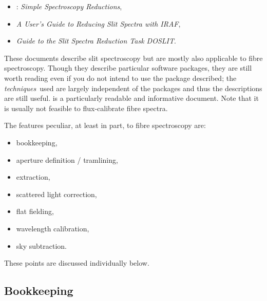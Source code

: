 \documentclass[twoside,11pt]{starlink}
\begin{document}
\begin{itemize}

  \item {}: \textit{Simple Spectroscopy
   Reductions}\/\cite{SC7},

  \item \textit{A User's Guide to Reducing Slit Spectra with
   IRAF}\/\cite{MASSEY92},

  \item \textit{Guide to the Slit Spectra Reduction Task
   DOSLIT}\/\cite{VALDES92B}.

\end{itemize}

These documents describe slit spectroscopy but are mostly also
applicable to fibre spectroscopy.  Though they describe particular
software packages, they are still worth reading even if you do not
intend to use the package described; the \textit{techniques}\, used are
largely independent of the packages and thus the descriptions are still
useful.   is a particularly readable and informative
document.  Note that it is usually not feasible to flux-calibrate
fibre spectra.

The features peculiar, at least in part, to fibre spectroscopy are:

\begin{itemize}

  \item bookkeeping,

  \item aperture definition / tramlining,

  \item extraction,

  \item scattered light correction,

  \item flat fielding,

  \item wavelength calibration,

  \item sky subtraction.

\end{itemize}

These points are discussed individually below.

\subsection{Bookkeeping}
\end{document}
